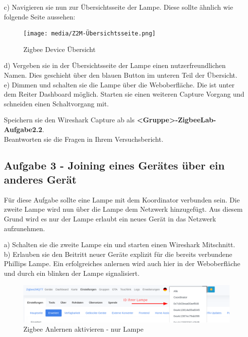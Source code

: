 c) Navigieren sie nun zur Übersichtsseite der Lampe. Diese sollte ähnlich wie folgende Seite aussehen:

\begin{figure}[H]
    \centering
    \texttt{[image: media/Z2M-Übersichtsseite.png]}
    \caption{Zigbee Device Übersicht}
\end{figure}

d) Vergeben sie in der Übersichtsseite der Lampe einen nutzerfreundlichen Namen. Dies geschieht über den blauen Button im unteren Teil der Übersicht.\\
e) Dimmen und schalten sie die Lampe über die Weboberfläche. Die ist unter dem Reiter \grqq Dashboard\grqq{} möglich. Starten sie einen weiteren Capture Vorgang und
schneiden einen Schaltvorgang mit.

\begin{Aufgabe}
    Speichern sie den Wireshark Capture ab als \textbf{\grqq <Gruppe>-ZigbeeLab-Aufgabe2.2\grqq{}}. \\
    Beantworten sie die Fragen in Ihrem Versuchsbericht.
\end{Aufgabe}

\subsection{Aufgabe 3 - Joining eines Gerätes über ein anderes Gerät}
Für diese Aufgabe sollte eine Lampe mit dem Koordinator verbunden sein. Die zweite Lampe wird nun über die Lampe dem Netzwerk hinzugefügt. Aus diesem Grund wird es nur der Lampe
erlaubt ein neues Gerät in das Netzwerk aufzunehmen. 

a) Schalten sie die zweite Lampe ein und starten einen Wireshark Mitschnitt.\\
b) Erlauben sie den Beitritt neuer Geräte explizit für die bereits verbundene Phillips Lampe.
Ein erfolgreiches anlernen wird auch hier in der Weboberfläche und durch ein blinken der Lampe signalisiert. 

\begin{figure}[H]
    \centering
    \includegraphics[width=1\textwidth]{media/Z2M-Anlernen-Lampe.png}
    \caption{Zigbee Anlernen aktivieren - nur Lampe}
\end{figure}

